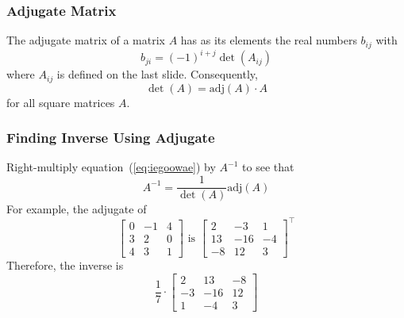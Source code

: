 \documentclass[xcolor=dvipsnames]{beamer}
\begin{document}
\begin{frame}
  \frametitle{Adjugate Matrix}
The \alert{adjugate matrix} of a matrix $A$ has as its elements the
real numbers $b_{ij}$ with
\begin{equation}
  \label{eq:quesieha}
  b_{ji}=(-1)^{i+j}\det(A_{ij})
\end{equation}
where $A_{ij}$ is defined on the last slide. Consequently,
\begin{equation}
  \label{eq:iegoowae}
  \det(A)=\mbox{adj}(A)\cdot{}A
\end{equation}
for all square matrices $A$.
\end{frame}

\begin{frame}
  \frametitle{Finding Inverse Using Adjugate}
  Right-multiply equation~(\ref{eq:iegoowae}) by $A^{-1}$ to see that
  \begin{equation}
    \label{eq:foomochu}
    A^{-1}=\frac{1}{\det(A)}\mbox{adj}(A)
  \end{equation}
  For example, the adjugate of
  \begin{equation}
    \label{eq:soojohdi}
    \left[
      \begin{array}{ccc}
        0 & -1 & 4 \\
        3 & 2 & 0 \\
        4 & 3 & 1 
      \end{array}\right]\mbox{ is }\left[
      \begin{array}{ccc}
        2 & -3 & 1 \\
        13 & -16 & -4 \\
        -8 & 12 & 3 
\end{array}\right]^{\intercal}
  \end{equation}
  Therefore, the inverse is
  \begin{equation}
    \label{eq:fiaphaid}
    \frac{1}{7}\cdot\left[
      \begin{array}{ccc}
        2 & 13 & -8 \\
        -3 & -16 & 12 \\
        1 & -4 & 3 
      \end{array}\right]
  \end{equation}
\end{frame}
\end{document}
